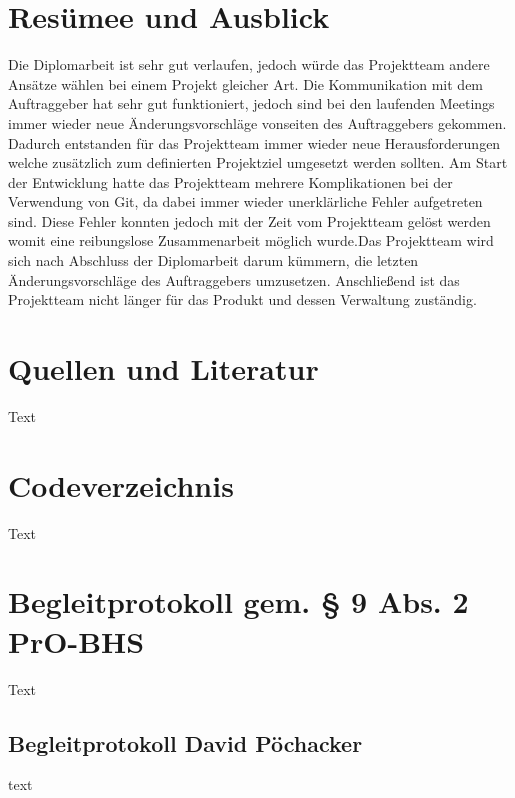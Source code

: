 \chapter{Resümee und Ausblick}
Die Diplomarbeit ist sehr gut verlaufen, jedoch würde das Projektteam andere Ansätze wählen bei einem Projekt gleicher Art. Die Kommunikation mit dem Auftraggeber hat sehr gut funktioniert, jedoch sind bei den laufenden Meetings immer wieder neue Änderungsvorschläge vonseiten des Auftraggebers gekommen. Dadurch entstanden für das Projektteam immer wieder neue Herausforderungen welche zusätzlich zum definierten Projektziel umgesetzt werden sollten. Am Start der Entwicklung hatte das Projektteam mehrere Komplikationen bei der Verwendung  von Git, da dabei immer wieder unerklärliche Fehler aufgetreten sind. Diese Fehler konnten jedoch mit der Zeit vom Projektteam gelöst werden womit eine reibungslose Zusammenarbeit möglich wurde.Das Projektteam wird sich nach Abschluss der Diplomarbeit darum kümmern, die letzten Änderungsvorschläge des Auftraggebers umzusetzen. Anschließend ist das Projektteam nicht länger für das Produkt und dessen Verwaltung zuständig.


\chapter{Quellen und Literatur}
Text

\listoffigures

\listoftables

\chapter{Codeverzeichnis}
Text


\chapter{Begleitprotokoll gem. § 9 Abs. 2 PrO-BHS}
Text

\section{Begleitprotokoll David Pöchacker}
text
\newpage
